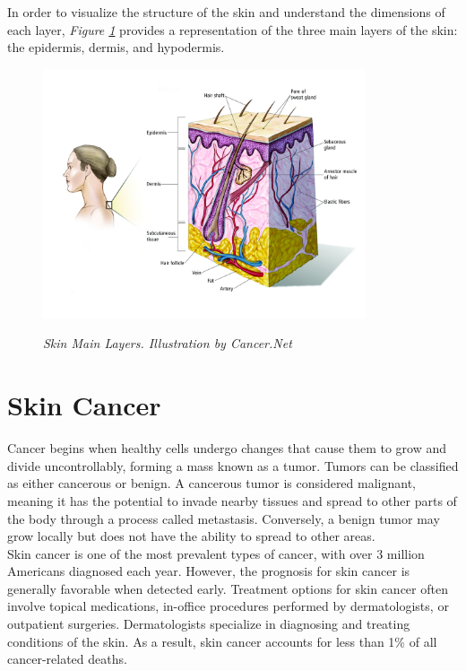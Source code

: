 In order to visualize the structure of the skin and understand the dimensions of each layer, \textit{Figure \ref{fig:melanoma_diagram}} provides a representation of the three main layers of the skin: the epidermis, dermis, and hypodermis.

\begin{figure}[H]
\centering
\includegraphics[width=0.85\textwidth]{imatges/problem_domain/melanoma-diagram.jpg}
\caption[Skin Main Layers]{\textit{Skin Main Layers. Illustration by Cancer.Net}}
{\label{fig:melanoma_diagram}}
\end{figure}

\section{Skin Cancer}

Cancer begins when healthy cells undergo changes that cause them to grow and divide uncontrollably, forming a mass known as a tumor. Tumors can be classified as either cancerous or benign. A cancerous tumor is considered malignant, meaning it has the potential to invade nearby tissues and spread to other parts of the body through a process called metastasis. Conversely, a benign tumor may grow locally but does not have the ability to spread to other areas. \\

Skin cancer is one of the most prevalent types of cancer, with over 3 million Americans diagnosed each year. However, the prognosis for skin cancer is generally favorable when detected early. Treatment options for skin cancer often involve topical medications, in-office procedures performed by dermatologists, or outpatient surgeries. Dermatologists specialize in diagnosing and treating conditions of the skin. As a result, skin cancer accounts for less than 1\% of all cancer-related deaths. \\

